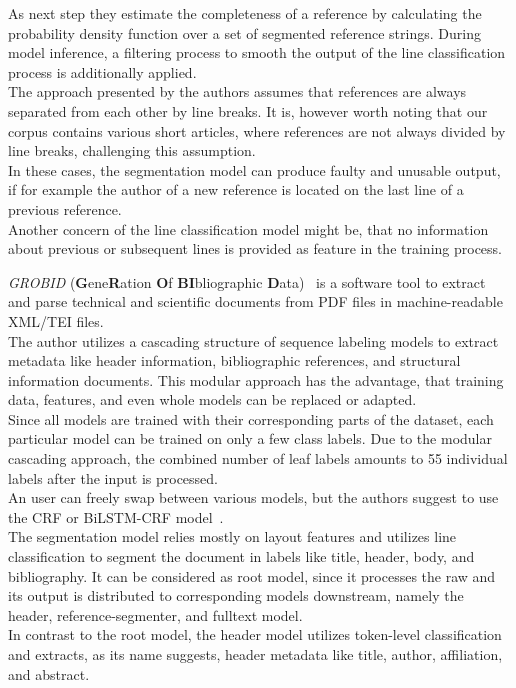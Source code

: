 As next step they estimate the completeness of a reference by calculating the probability density function over a set of segmented reference strings. During model inference, a filtering process to smooth the output of the line classification process is additionally applied.\\
The approach presented by the authors assumes that references are always separated from each other by line breaks. It is, however worth noting that our corpus contains various short articles, where references are not always divided by line breaks, challenging this assumption.\\
In these cases, the segmentation model can produce faulty and unusable output, if for example the author of a new reference is located on the last line of a previous reference.\\
Another concern of the line classification model might be, that no information about previous or subsequent lines is provided as feature in the training process.\par
\textit{GROBID} (\textbf{G}ene\textbf{R}ation \textbf{O}f \textbf{BI}bliographic \textbf{D}ata)~\cite{GROBID_pref} is a software tool to extract and parse technical and scientific documents from PDF files in machine-readable XML/TEI files.\\
The author utilizes a cascading structure of sequence labeling models to extract metadata like header information, bibliographic references, and structural information documents. This modular approach has the advantage, that training data, features, and even whole models can be replaced or adapted.\\
Since all models are trained with their corresponding parts of the dataset, each particular model can be trained on only a few class labels. Due to the modular cascading approach, the combined number of leaf labels amounts to 55 individual labels after the input is processed.\\
An user can freely swap between various models, but the authors suggest to use the CRF or BiLSTM-CRF model~\cite{chen2017improving}.\\
The segmentation model relies mostly on layout features and utilizes line classification to segment the document in labels like title, header, body, and bibliography. It can be considered as root model, since it processes the raw and its output is distributed to corresponding models downstream, namely the header, reference-segmenter, and fulltext model.\\
In contrast to the root model, the header model utilizes token-level classification and extracts, as its name suggests, header metadata like title, author, affiliation, and abstract.\\
